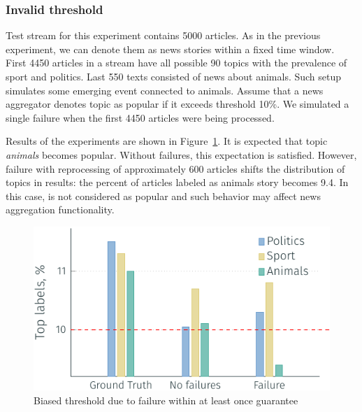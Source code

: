 \subsubsection{Invalid threshold}


Test stream for this experiment contains 5000 articles. As in the previous experiment, we can denote them as news stories within a fixed time window. First 4450 articles in a stream have all possible 90 topics with the prevalence of sport and politics. Last 550 texts consisted of news about animals. Such setup simulates some emerging event connected to animals. Assume that a news aggregator denotes topic as popular if it exceeds threshold 10\%. We simulated a single failure when the first 4450 articles were being processed.

Results of the experiments are shown in Figure~\ref{biased_threshold}. It is expected that topic {\em animals} becomes popular. Without failures, this expectation is satisfied. However, failure with reprocessing of approximately 600 articles shifts the distribution of topics in results: the percent of articles labeled as animals story becomes 9.4. In this case, is not considered as popular and such behavior may affect news aggregation functionality.

\begin{figure}[htbp]
  \centering
  \includegraphics[scale=0.68]{pics/biased_threshold}
  \caption{Biased threshold due to failure within at least once guarantee}
  \label {biased_threshold}
\end{figure}

